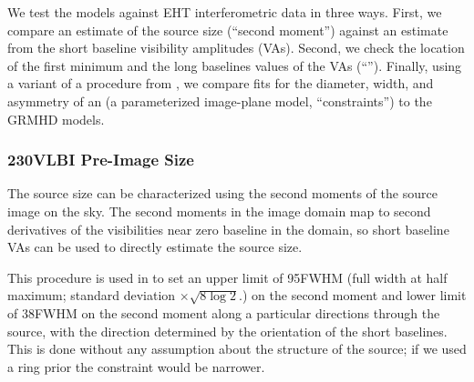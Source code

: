 
We test the models against EHT interferometric data in three ways.
First, we compare an estimate of the source size (``second moment'')
against an estimate from the short baseline visibility amplitudes (VAs).
Second, we check the location of the first minimum and the long
baselines values of the VAs (``\vam'').
Finally, using a variant of a procedure from , we
compare fits for the diameter, width, and asymmetry of an \mring (a parameterized image-plane model, ``\mring constraints'') to the GRMHD models.

\subsubsection{230\GHz VLBI Pre-Image Size}
\label{sec:sz}


The source size can be characterized using the second moments of the
source image on the sky.
The second moments in the image domain map to second derivatives of
the visibilities near zero baseline in the \uv domain, so short
baseline VAs can be used to directly estimate the source size.

This procedure is used in  to set an upper limit
of 95\uas FWHM (full width at half maximum; standard deviation $\times \sqrt{8\log{2}}$.) on the second moment and lower limit of 38\uas FWHM on the second moment along a particular directions through the source, with the direction determined by the orientation of the short
baselines.
This is done without any assumption about the structure of the source;
if we used a ring prior the constraint would be narrower.

